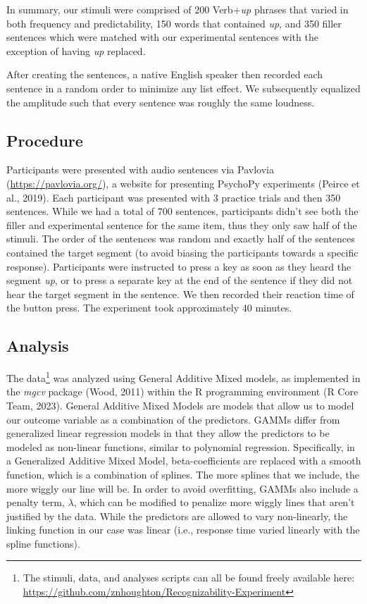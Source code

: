 \documentclass[
  man,floatsintext]{apa6}
\begin{document}
In summary, our stimuli were comprised of 200 Verb+\emph{up} phrases that varied in both frequency and predictability, 150 words that contained \emph{up}, and 350 filler sentences which were matched with our experimental sentences with the exception of having \emph{up} replaced.

After creating the sentences, a native English speaker then recorded each sentence in a random order to minimize any list effect. We subsequently equalized the amplitude such that every sentence was roughly the same loudness.

\hypertarget{procedure}{%
\subsection{Procedure}\label{procedure}}

Participants were presented with audio sentences via Pavlovia (\url{https://pavlovia.org/}), a website for presenting PsychoPy experiments (Peirce et al., 2019). Each participant was presented with 3 practice trials and then 350 sentences. While we had a total of 700 sentences, participants didn't see both the filler and experimental sentence for the same item, thus they only saw half of the stimuli. The order of the sentences was random and exactly half of the sentences contained the target segment (to avoid biasing the participants towards a specific response). Participants were instructed to press a key as soon as they heard the segment \emph{up}, or to press a separate key at the end of the sentence if they did not hear the target segment in the sentence. We then recorded their reaction time of the button press. The experiment took approximately 40 minutes.

\hypertarget{analysis}{%
\subsection{Analysis}\label{analysis}}

The data\footnote{The stimuli, data, and analyses scripts can all be found freely available here: \url{https://github.com/znhoughton/Recognizability-Experiment}} was analyzed using General Additive Mixed models, as implemented in the \emph{mgcv} package (Wood, 2011) within the R programming environment (R Core Team, 2023). General Additive Mixed Models are models that allow us to model our outcome variable as a combination of the predictors. GAMMs differ from generalized linear regression models in that they allow the predictors to be modeled as non-linear functions, similar to polynomial regression. Specifically, in a Generalized Additive Mixed Model, beta-coefficients are replaced with a smooth function, which is a combination of splines. The more splines that we include, the more wiggly our line will be. In order to avoid overfitting, GAMMs also include a penalty term, \(\lambda\), which can be modified to penalize more wiggly lines that aren't justified by the data. While the predictors are allowed to vary non-linearly, the linking function in our case was linear (i.e., response time varied linearly with the spline functions).
\end{document}
